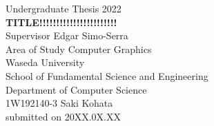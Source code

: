 \documentclass[a4paper, oneside, uplatex, 12pt]{book}
\begin{document}


\begin{titlepage}
\begin{center}
    \vspace{0.1\textheight}
    {\Large Undergraduate Thesis 2022} \\
    \vspace{0.05\textheight}
    \vspace{0.05\textheight}
    \textbf{\huge TITLE!!!!!!!!!!!!!!!!!!!!!!!} \\
    \vfill
    {\Large Supervisor \hspace{0.02\textwidth} Edgar Simo-Serra} \\
    {\Large Area of Study \hspace{0.02\textwidth} Computer Graphics} \\
    \vspace{0.05\textheight}
    {\Large 
        Waseda University \\
        School of Fundamental Science and Engineering \\
        Department of Computer Science \\}
    \vspace{0.05\textheight}
    {\Large 1W192140-3 Saki Kohata \\}
    \vspace{0.05\textheight}
    {submitted on 20XX.0X.XX}
\end{center}
\end{titlepage}
    
\end{document}
